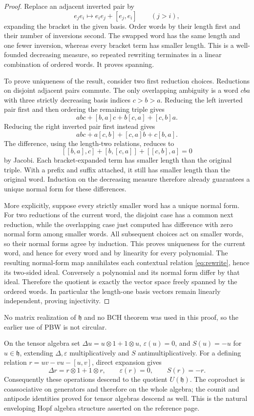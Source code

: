 \documentclass[11pt]{article}
\numberwithin{equation}{section}
\theoremstyle{definition}
\theoremstyle{remark}
\newcommand{\h}{\mathfrak{h}}
\newcommand{\eps}{\varepsilon}
\begin{document}
\begin{proof}
Replace an adjacent inverted pair by
\begin{equation}\label{eq:rewrite}
 e_je_i\longmapsto e_ie_j+[e_j,e_i]\qquad(j>i),
\end{equation}
expanding the bracket in the given basis. Order words by their
length first and their number of inversions second. The swapped
word has the same length and one fewer inversion, whereas every
bracket term has smaller length. This is a well-founded decreasing
measure, so repeated rewriting terminates in a linear combination
of ordered words. It proves spanning.

To prove uniqueness of the result, consider two first reduction
choices. Reductions on disjoint adjacent pairs commute. The only
overlapping ambiguity is a word $cba$ with three strictly decreasing
basis indices $c>b>a$. Reducing the left inverted pair first and
then ordering the remaining triple gives
\[
 abc+[b,a]c+b[c,a]+[c,b]a.
\]
Reducing the right inverted pair first instead gives
\[
 abc+a[c,b]+[c,a]b+c[b,a].
\]
The difference, using the length-two relations, reduces to
\[
 [[b,a],c]+[b,[c,a]]+[[c,b],a]=0
\]
by Jacobi. Each bracket-expanded term has smaller length than the
original triple. With a prefix and suffix attached, it still has
smaller length than the original word. Induction on the decreasing
measure therefore already guarantees a unique normal form for
these differences.

More explicitly, suppose every strictly smaller word has a unique
normal form. For two reductions of the current word, the disjoint
case has a common next reduction, while the overlapping case just
computed has difference with zero normal form among smaller words.
All subsequent choices act on smaller words, so their normal forms
agree by induction. This proves uniqueness for the current word,
and hence for every word and by linearity for every polynomial.
The resulting normal-form map annihilates each contextual relation
\eqref{eq:rewrite}, hence its two-sided ideal. Conversely a
polynomial and its normal form differ by that ideal. Therefore the
quotient is exactly the vector space freely spanned by the ordered
words. In particular the length-one basis vectors remain linearly
independent, proving injectivity.
\end{proof}
No matrix realization of $\h$ and no BCH theorem was used in this
proof, so the earlier use of PBW is not circular.

On the tensor algebra set
$\Delta u=u\otimes1+1\otimes u$, $\eps(u)=0$, and $S(u)=-u$
for $u\in\h$, extending $\Delta,\eps$ multiplicatively and $S$
antimultiplicatively. For a defining relation
$r=uv-vu-[u,v]$, direct expansion gives
\[
 \Delta r=r\otimes1+1\otimes r,\qquad \eps(r)=0,\qquad S(r)=-r.
\]
Consequently these operations descend to the quotient $U(\h)$.
The coproduct is coassociative on generators and therefore on the
whole algebra; the counit and antipode identities proved for tensor
algebras descend as well. This is the natural enveloping Hopf
algebra structure asserted on the reference page.
\end{document}
